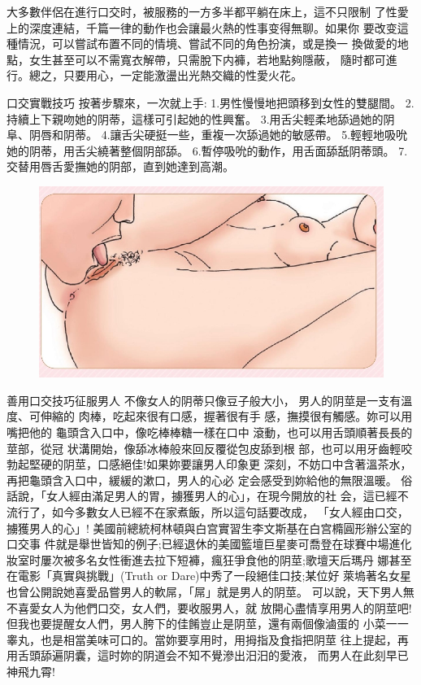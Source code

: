 \documentclass[12pt,UTF8]{ctexbook}
\begin{document}
大多數伴侶在進行口交时，被服務的一方多半都平躺在床上，這不只限制
了性愛上的深度連結，千篇一律的動作也会讓最火熱的性事变得無聊。如果你
要改变這種情況，可以嘗試布置不同的情境、嘗試不同的角色扮演，或是換一
換做愛的地點，女生甚至可以不需寬衣解帶，只需脫下内褲，若地點夠隱蔽，
隨时都可進行。總之，只要用心，一定能激盪出光熱交織的性愛火花。

口交實戰技巧
按著步驟來，一次就上手:
1.男性慢慢地把頭移到女性的雙腿間。
2.持續上下親吻她的阴蒂，這樣可引起她的性興奮。
3.用舌尖輕柔地舔過她的阴阜、阴唇和阴蒂。
4.讓舌尖硬挺一些，重複一次舔過她的敏感帶。
5.輕輕地吸吮她的阴蒂，用舌尖繞著整個阴部舔。
6.暫停吸吮的動作，用舌面舔舐阴蒂頭。
7.交替用唇舌愛撫她的阴部，直到她達到高潮。

\begin{figure}[htbp]
	\centering
	\includegraphics[width=0.7\linewidth]{19}
	\caption{}
	\label{fig:1}
\end{figure}

善用口交技巧征服男人
不像女人的阴蒂只像豆子般大小，
男人的阴莖是一支有溫度、可伸縮的
肉棒，吃起來很有口感，握著很有手
感，撫摸很有觸感。妳可以用嘴把他的
龜頭含入口中，像吃棒棒糖一樣在口中
滾動，也可以用舌頭順著長長的莖部，從冠
状溝開始，像舔冰棒般來回反覆從包皮舔到根
部，也可以用牙齒輕咬勃起堅硬的阴莖，口感絕佳!如果妳要讓男人印象更
深刻，不妨口中含著溫茶水，再把龜頭含入口中，緩緩的漱口，男人的心必
定会感受到妳給他的無限溫暖。
俗話說，「女人經由滿足男人的胃，擄獲男人的心」，在現今開放的社
会，這已經不流行了，如今多數女人已經不在家煮飯，所以這句話要改成，
「女人經由口交，擄獲男人的心」!
美國前總統柯林頓與白宫實習生李文斯基在白宫橢圓形辦公室的口交事
件就是舉世皆知的例子;已經退休的美國籃壇巨星麥可喬登在球賽中場進化妝室时屢次被多名女性衝進去拉下短褲，瘋狂爭食他的阴莖;歌壇天后瑪丹
娜甚至在電影「真實與挑戰」(Truth or Dare)中秀了一段絕佳口技;某位好
萊塢著名女星也曾公開說她喜愛品嘗男人的軟屌，「屌」就是男人的阴莖。
可以說，天下男人無不喜愛女人为他們口交，女人們，要收服男人，就
放開心盡情享用男人的阴莖吧!
但我也要提醒女人們，男人胯下的佳餚豈止是阴莖，還有兩個像滷蛋的
小菜一一睾丸，也是相當美味可口的。當妳要享用时，用拇指及食指把阴莖
往上提起，再用舌頭舔遍阴囊，這时妳的阴道会不知不覺滲出汨汨的愛液，
而男人在此刻早已神飛九霄!
\end{document}
